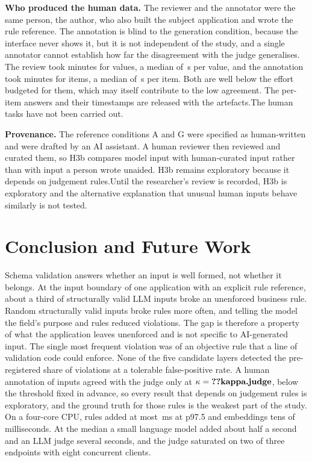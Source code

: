 \documentclass[conference]{IEEEtran}
\begin{document}
\textbf{Who produced the human data.} \ifhumanlabels The reviewer and the annotator were the same
person, the author, who also built the subject application and wrote the rule reference. The annotation
is blind to the generation condition, because the interface never shows it, but it is not independent
of the study, and a single annotator cannot establish how far the disagreement with the judge
generalises. The review took  minutes for  values, a median of
\,s per value, and the annotation took  minutes for 
items, a median of \,s per item. Both are well below the effort budgeted for them,
which may itself contribute to the low agreement. The per-item answers and their timestamps are
released with the artefacts.\else The human tasks have not been carried out.\fi

\textbf{Provenance.} The reference conditions A and G were specified as human-written and were drafted
by an AI assistant. \ifreviewed A human reviewer then reviewed and curated them, so H3b compares model
input with human-curated input rather than with input a person wrote unaided. H3b remains exploratory
because it depends on judgement rules.\else Until the researcher's review is recorded, H3b is
exploratory and the alternative explanation that unusual human inputs behave similarly is not
tested.\fi

\section{Conclusion and Future Work}
\label{sec:conclusion}

Schema validation answers whether an input is well formed, not whether it belongs. At the input
boundary of one application with an explicit rule reference, about a third of structurally valid LLM
inputs broke an unenforced business rule. Random structurally valid inputs broke rules more often, and
telling the model the field's purpose and rules reduced violations. The gap is therefore a property of
what the application leaves unenforced and is not specific to AI-generated input. The single most
frequent violation was of an objective rule that a line of validation code could enforce. None of the
five candidate layers detected the pre-registered share of violations at a tolerable false-positive
rate.\ifjudgeweak{} A human annotation of  inputs agreed with the judge only at
$\kappa=\R{kappa.judge}$, below the threshold fixed in advance, so every result that depends on
judgement rules is exploratory, and the ground truth for those rules is the weakest part of the
study.\fi{} On a four-core CPU, rules added at most \,ms at p97.5 and embeddings tens
of milliseconds. At the median a small language model added about half a second and an LLM judge
several seconds, and the judge saturated on two of three endpoints with eight concurrent clients.
\end{document}
